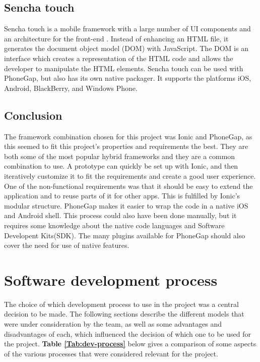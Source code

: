 \subsection{Sencha touch}

Sencha touch is a mobile framework with a large number of UI components and an architecture for the front-end \cite{RA4}. Instead of enhancing an HTML file, it generates the document object model (DOM) with JavaScript. The DOM is an interface which creates a representation of the HTML code and allows the developer to manipulate the HTML elements. Sencha touch can be used with PhoneGap, but also has its own native packager. It supports the platforms iOS, Android, BlackBerry, and Windows Phone.

\subsection{Conclusion}

The framework combination chosen for this project was Ionic and PhoneGap, as this seemed to fit this project's properties and requirements the best. They are both some of the most popular hybrid frameworks and they are a common combination to use. A prototype can quickly be set up with Ionic, and then iteratively customize it to fit the requirements and create a good user experience. One of the non-functional requirements was that it should be easy to extend the application and to reuse parts of it for other apps. This is fulfilled by Ionic's modular structure. PhoneGap makes it easier to wrap the code in a native iOS and Android shell. This process could also have been done manually, but it requires some knowledge about the native code languages and Software Developent Kits(SDK). The many plugins available for PhoneGap should also cover the need for use of native features.

\section{Software development process}

The choice of which development process to use in the project was a central decision to be made. The following sections describe the different models that were under consideration by the team, as well as some advantages and disadvantages of each, which influenced the decision of which one to be used for the project. \textbf{Table \ref{Tab:dev-process}} below gives a comparison of some aspects of the various processes that were considered relevant for the project.

